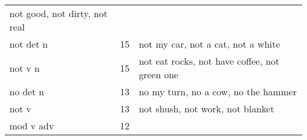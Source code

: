 \documentclass[man]{apa6}
\begin{document}
\begin{longtable}[]{@{}lll@{}}
\begin{minipage}[t]{0.47\columnwidth}
not good, not dirty, not real\strut
\end{minipage}\tabularnewline
\begin{minipage}[t]{0.23\columnwidth}\raggedright\strut
not det n\strut
\end{minipage} & \begin{minipage}[t]{0.15\columnwidth}\raggedright\strut
15\strut
\end{minipage} & \begin{minipage}[t]{0.47\columnwidth}\raggedright\strut
not my car, not a cat, not a white\strut
\end{minipage}\tabularnewline
\begin{minipage}[t]{0.23\columnwidth}\raggedright\strut
not v n\strut
\end{minipage} & \begin{minipage}[t]{0.15\columnwidth}\raggedright\strut
15\strut
\end{minipage} & \begin{minipage}[t]{0.47\columnwidth}\raggedright\strut
not eat rocks, not have coffee, not green one\strut
\end{minipage}\tabularnewline
\begin{minipage}[t]{0.23\columnwidth}\raggedright\strut
no det n\strut
\end{minipage} & \begin{minipage}[t]{0.15\columnwidth}\raggedright\strut
13\strut
\end{minipage} & \begin{minipage}[t]{0.47\columnwidth}\raggedright\strut
no my turn, no a cow, no the hammer\strut
\end{minipage}\tabularnewline
\begin{minipage}[t]{0.23\columnwidth}\raggedright\strut
not v\strut
\end{minipage} & \begin{minipage}[t]{0.15\columnwidth}\raggedright\strut
13\strut
\end{minipage} & \begin{minipage}[t]{0.47\columnwidth}\raggedright\strut
not shush, not work, not blanket\strut
\end{minipage}\tabularnewline
\begin{minipage}[t]{0.23\columnwidth}\raggedright\strut
mod v adv\strut
\end{minipage} & \begin{minipage}[t]{0.15\columnwidth}\raggedright\strut
12\strut
\end{minipage} & \begin{minipage}[t]{0.47\columnwidth}\raggedright\strut

\end{minipage}
\end{longtable}
\end{document}
